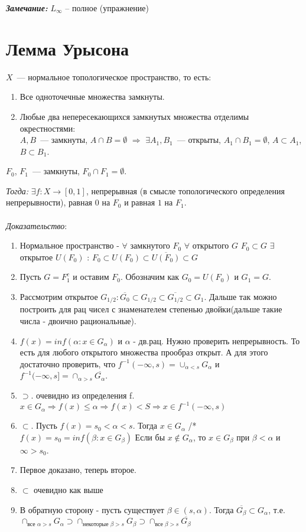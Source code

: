 \documentclass[paper=a4, fontsize=17pt]{article}
\begin{document}
\textbf{\emph{Замечание:}} $ L_{\infty} $ -- полное (упражнение)

\section{Лемма Урысона}
$X$~--- нормальное топологическое пространство, то есть:
\begin{enumerate}
    \item Все одноточечные множества замкнуты.
    \item Любые два непересекающихся замкнутых множества отделимы окрестностями:\\
    $A,B$~--- замкнуты, $A \cap B = \emptyset$ $\Rightarrow$ $\exists A_1,B_1$~--- открыты, $A_1 \cap B_1 = \emptyset$,
    $A \subset A_1$, $B \subset B_1$.
\end{enumerate}

$F_0$, $F_1$~--- замкнуты, $F_0 \cap F_1 = \emptyset$.

\emph{Тогда:} $\exists f: X \rightarrow [0,1]$, непрерывная (в смысле топологического определения непрерывности), равная $0$ на $F_0$ и равная $1$ на $F_1$.
\\\\
\emph{Доказательство}:

\begin{enumerate}
	\item Нормальное пространство - $\forall$ замкнутого $F_0$  $\forall$ открытого $G$ $F_0 \subset G$ $\exists$ открытое $U(F_0)$ : $F_0 \subset U(F_0) \subset \overline{U(F_0)} \subset G$ 
	\item Пусть $G = F_1^c$ и оставим $F_0$. Обозначим как $G_0 = U(F_0)$ и $G_1 = G$.
	\item Рассмотрим открытое $G_{1/2} :  \overline{G_0} \subset G_{1/2} \subset \overline{G_{1/2}} \subset G_1$. Дальше так можно построить для рац чисел с знаменателем степенью двойки(дальше такие числа - двоично рациональные).
	\item $f(x) = inf(\alpha : x \in G_\alpha)$ и $\alpha$ - дв.рац. Нужно проверить непрерывность. То есть для любого открытого множества прообраз открыт. А для этого достаточно проверить, что $f^{-1}(-\infty, s) = \cup_{\alpha < s} G_\alpha$ и $f^{-1}(-\infty, s] = \cap_{\alpha > s} \overline{G_\alpha}$. 
	\item $\supset$. очевидно из определения f. $x \in G_\alpha \Rightarrow f(x) \leq \alpha \Rightarrow f(x) < S \Rightarrow x \in f^{-1}(-\infty, s)$
	\item $\subset$. Пусть $f(x) = s_0 < \alpha < s$. Тогда $x \in G_\alpha$ /* $f(x) = s_0 = inf(\beta : x \in G_\beta)$ Если бы $x \notin G_\alpha$, то $x \in G_\beta$ при $\beta < \alpha$ и $\infty > s_0$.
	\item Первое доказано, теперь второе. 
	\item $\subset$ очевидно как выше
	\item В обратную сторону - пусть существует $\beta \in (s, \alpha)$. Тогда $\overline{G_\beta} \subset G_\alpha$, т.е. $\cap_{\text{все } \alpha > s} G_\alpha  \supset \cap_{\text{некоторые } \beta > s} G_\beta \supset \cap_{\text{все } \beta > s} \overline{G_\beta}$ 
	
\end{enumerate} 
\end{document}
